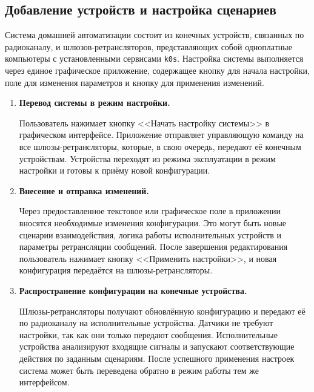 \documentclass[14pt,a4paper]{extarticle}
\begin{document}
\subsection{Добавление устройств и настройка сценариев}

Система домашней автоматизации состоит из конечных устройств, связанных по радиоканалу, и шлюзов-ретрансляторов, представляющих собой одноплатные компьютеры с установленными сервисами \texttt{k0s}. Настройка системы выполняется через единое графическое приложение, содержащее кнопку для начала настройки, поле для изменения параметров и кнопку для применения изменений.

\begin{enumerate}[label=\textbf{\arabic*.}]
    \item \textbf{Перевод системы в режим настройки.} 
    
    Пользователь нажимает кнопку <<Начать настройку системы>> в графическом интерфейсе. Приложение отправляет управляющую команду на все шлюзы-ретрансляторы, которые, в свою очередь, передают её конечным устройствам. Устройства переходят из режима эксплуатации в режим настройки и готовы к приёму новой конфигурации.
    
    \item \textbf{Внесение и отправка изменений.} 
    
    Через предоставленное текстовое или графическое поле в приложении вносятся необходимые изменения конфигурации. Это могут быть новые сценарии взаимодействия, логика работы исполнительных устройств и параметры ретрансляции сообщений. После завершения редактирования пользователь нажимает кнопку <<Применить настройки>>, и новая конфигурация передаётся на шлюзы-ретрансляторы.
    
    \item \textbf{Распространение конфигурации на конечные устройства.} 
    
    Шлюзы-ретрансляторы получают обновлённую конфигурацию и передают её по радиоканалу на исполнительные устройства. Датчики не требуют настройки, так как они только передают сообщения. Исполнительные устройства анализируют входящие сигналы и запускают соответствующие действия по заданным сценариям. После успешного применения настроек система может быть переведена обратно в режим работы тем же интерфейсом.
\end{enumerate}






\newpage
\end{document}
